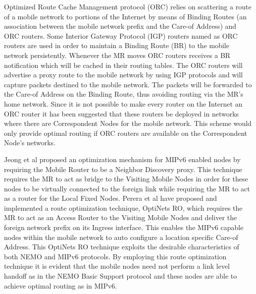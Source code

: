 Optimized Route Cache Management protocol (ORC) \cite{25} relies on scattering
a route of a mobile network to portions of the Internet by means of Binding
Routes (an association between the mobile network prefix and the Care-of
Address) and ORC routers. Some Interior Gateway Protocol (IGP) routers named
as ORC routers are used in order to maintain a Binding Route (BR) to the
mobile network persistently. Whenever the MR moves ORC routers receives a BR
notification which will be cached in their routing tables. The ORC routers
will advertise a proxy route to the mobile network by using IGP protocols and
will capture packets destined to the mobile network. The packets will be
forwarded to the Care-of Address on the Binding Route, thus avoiding routing via the MR's
home network. Since it is not possible to make every router on the Internet an
ORC router it has been suggested that these routers be deployed in networks
where there are Correspondent Nodes for the mobile network. This scheme would
only provide optimal routing if ORC routers are available on the Correspondent
Node's networks.

Jeong et al \cite{26} proposed an optimization mechanism for MIPv6 enabled
nodes by requiring the Mobile Router to be a Neighbor Discovery proxy. This
technique requires the MR to act as bridge to the Visiting Mobile Nodes in order for these nodes to be virtually connected to the foreign link while requiring the MR to act as a router for the Local Fixed Nodes. Perera et al \cite{27} have proposed and implemented
\cite{16} a route optimization technique, OptiNets RO, which requires the MR
to act as an Access Router to the Visiting Mobile Nodes and deliver the foreign network prefix
on its Ingress interface. This enables the MIPv6 capable nodes
within the mobile network to auto configure a location specific Care-of
Address. This OptiNets RO technique exploits the desirable characteristics of
both NEMO and MIPv6 protocols. By employing this route optimization technique
it is evident that the mobile nodes need not perform a link level handoff as
in the NEMO Basic Support protocol and these nodes are able to achieve optimal
routing as in MIPv6.

